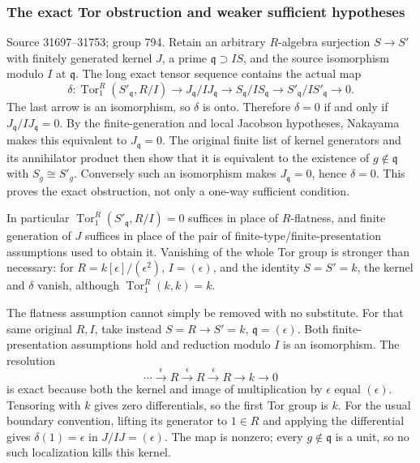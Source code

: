 \subsubsection{The exact Tor obstruction and weaker sufficient hypotheses}\label{algebra-proof-035-the-exact-tor-obstruction-and-weaker-sufficient-hypotheses}

Source 31697--31753; group 794. Retain an arbitrary \(R\)-algebra surjection \(S\to S'\) with finitely generated kernel \(J\), a prime \(\mathfrak q\supset IS\), and the source isomorphism modulo \(I\) at \(\mathfrak q\). The long exact tensor sequence contains the actual map \[
\delta:\operatorname{Tor}_1^R(S'_{\mathfrak q},R/I)
\longrightarrow J_{\mathfrak q}/IJ_{\mathfrak q}
\longrightarrow S_{\mathfrak q}/IS_{\mathfrak q}
\longrightarrow S'_{\mathfrak q}/IS'_{\mathfrak q}\longrightarrow0.
\] The last arrow is an isomorphism, so \(\delta\) is onto. Therefore \(\delta=0\) if and only if \(J_{\mathfrak q}/IJ_{\mathfrak q}=0\). By the finite-generation and local Jacobson hypotheses, Nakayama makes this equivalent to \(J_{\mathfrak q}=0\). The original finite list of kernel generators and its annihilator product then show that it is equivalent to the existence of \(g\notin\mathfrak q\) with \(S_g\cong S'_g\). Conversely such an isomorphism makes \(J_{\mathfrak q}=0\), hence \(\delta=0\). This proves the exact obstruction, not only a one-way sufficient condition.

In particular \(\operatorname{Tor}_1^R(S'_{\mathfrak q},R/I)=0\) suffices in place of \(R\)-flatness, and finite generation of \(J\) suffices in place of the pair of finite-type/finite-presentation assumptions used to obtain it. Vanishing of the whole Tor group is stronger than necessary: for \(R=k[\epsilon]/(\epsilon^2)\), \(I=(\epsilon)\), and the identity \(S=S'=k\), the kernel and \(\delta\) vanish, although \(\operatorname{Tor}_1^R(k,k)=k\).

The flatness assumption cannot simply be removed with no substitute. For that same original \(R,I\), take instead \(S=R\to S'=k\), \(\mathfrak q=(\epsilon)\). Both finite-presentation assumptions hold and reduction modulo \(I\) is an isomorphism. The resolution \[
\cdots\xrightarrow{\epsilon}R\xrightarrow{\epsilon}R
\xrightarrow{\epsilon}R\longrightarrow k\longrightarrow0
\] is exact because both the kernel and image of multiplication by \(\epsilon\) equal \((\epsilon)\). Tensoring with \(k\) gives zero differentials, so the first Tor group is \(k\). For the usual boundary convention, lifting its generator to \(1\in R\) and applying the differential gives \(\delta(1)=\epsilon\) in \(J/IJ=(\epsilon)\). The map is nonzero; every \(g\notin\mathfrak q\) is a unit, so no such localization kills this kernel.

